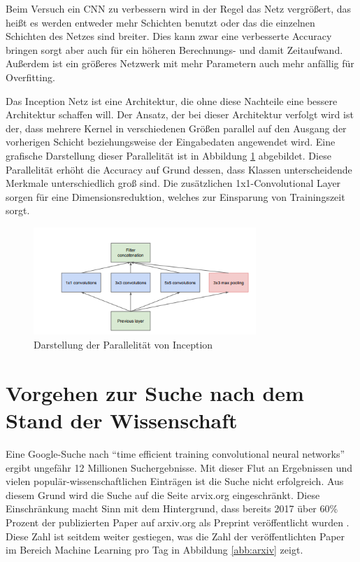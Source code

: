 Beim Versuch ein CNN zu verbessern wird in der Regel das Netz vergrößert, das heißt es werden entweder mehr Schichten benutzt oder das die einzelnen Schichten des Netzes sind breiter. Dies kann zwar eine verbesserte Accuracy bringen sorgt aber auch für ein höheren Berechnungs- und damit Zeitaufwand. Außerdem ist ein größeres Netzwerk mit mehr Parametern auch mehr anfällig für Overfitting.

Das Inception Netz ist eine Architektur, die ohne diese Nachteile eine bessere Architektur schaffen will. Der Ansatz, der bei dieser Architektur verfolgt wird ist der, dass mehrere Kernel in verschiedenen Größen parallel auf den Ausgang der vorherigen Schicht beziehungsweise der Eingabedaten angewendet wird. Eine grafische  Darstellung dieser Parallelität ist in Abbildung \ref{abb:inception} abgebildet. Diese Parallelität erhöht die Accuracy auf Grund dessen, dass Klassen unterscheidende Merkmale unterschiedlich groß sind.
Die zusätzlichen 1x1-Convolutional Layer sorgen für eine Dimensionsreduktion, welches zur Einsparung von Trainingszeit sorgt.


\begin{figure}[h]
 \centering
 \includegraphics[width=0.75\textwidth]{KapitelPartA/images/inception.png}
 \caption{Darstellung der Parallelität von Inception}
\label{abb:inception}
 
 \end{figure}





\section{Vorgehen zur Suche nach dem Stand der Wissenschaft}\label{sec:suche}
Eine Google-Suche nach ``time efficient training convolutional neural networks'' ergibt ungefähr 12 Millionen Suchergebnisse. Mit dieser Flut an Ergebnissen und vielen populär-wissenschaftlichen Einträgen ist die Suche nicht erfolgreich. Aus diesem Grund wird die Suche auf die Seite arvix.org eingeschränkt. Diese Einschränkung macht Sinn mit dem Hintergrund, dass bereits 2017 über 60\% Prozent der publizierten Paper auf arxiv.org als Preprint veröffentlicht wurden \cite{popular}. Diese Zahl ist seitdem weiter gestiegen, was die Zahl der veröffentlichten Paper im Bereich Machine Learning pro Tag in Abbildung \ref{abb:arxiv} zeigt.

